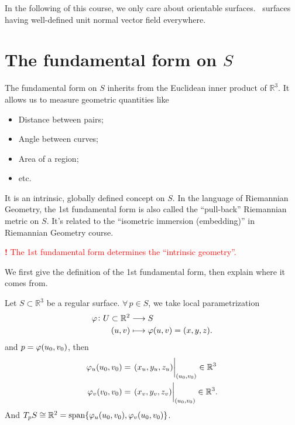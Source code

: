 \begin{remark}
    In the following of this course, we only care about orientable surfaces.
    \ie\ surfaces having well-defined unit normal vector field everywhere.
\end{remark}

\section{The \texorpdfstring{}{1st} fundamental form on \texorpdfstring{\(S\)}{S}}

The  fundamental form on \(S\) inherits from the Euclidean inner product of
\(\mathbb{R}^3\). It allows us to measure geometric quantities like
\begin{itemize}
    \item Distance between pairs;
    \item Angle between curves;
    \item Area of a region;
    \item etc.
\end{itemize}
It is an intrinsic, globally defined concept on \(S\). In the language of Riemannian
Geometry, the 1st fundamental form is also called the ``pull-back'' Riemannian
metric on \(S\). It's related to the ``isometric immersion (embedding)'' in 
Riemannian Geometry course.

\begin{center}
\textcolor{red}{
    \textbf{\large!} The 1st fundamental form determines the ``intrinsic
    geometry''.
}
\end{center}

We first give the definition of the 1st fundamental form, then explain where it
comes from.

Let \(S\subset \mathbb{R}^3\) be a regular surface. \(\forall\,p\in S\), we take
local parametrization
\begin{align*}
    \varphi\colon U\subset \mathbb{R}^2 &\longrightarrow S \\
    (u,v)&\longmapsto \varphi(u,v)=(x,y,z)
.\end{align*}
and \(p=\varphi(u_0,v_0)\), then 
\begin{align*}
    \vphi_u(u_0,v_0)&=\eval{(x_u,y_u,z_u)}_{(u_0,v_0)}\in \mathbb{R}^3 \\
    \vphi_v(v_0,v_0)&=\eval{(x_v,y_v,z_v)}_{(u_0,v_0)}\in \mathbb{R}^3
.\end{align*}
And \(T_p S\cong \mathbb{R}^2=\operatorname{span}\{\varphi_u(u_0,v_0),\varphi_v(u_0,v_0)\}\).

